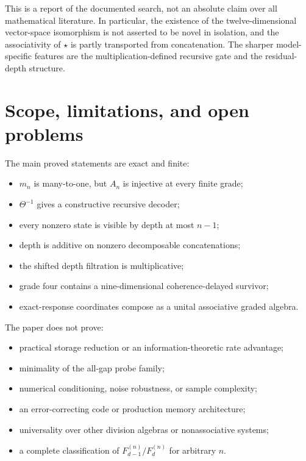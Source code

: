 \documentclass[11pt]{article}
\theoremstyle{definition}
\theoremstyle{remark}
\newcommand{\bridge}{\star}
\begin{document}
This is a report of the documented search, not an absolute claim over all mathematical literature.  In particular, the existence of the twelve-dimensional vector-space isomorphism is not asserted to be novel in isolation, and the associativity of $\bridge$ is partly transported from concatenation.  The sharper model-specific features are the multiplication-defined recursive gate and the residual-depth structure.

\section{Scope, limitations, and open problems}\label{sec:limitations}

The main proved statements are exact and finite:
\begin{itemize}
  \item $m_n$ is many-to-one, but $A_n$ is injective at every finite grade;
  \item $\Theta^{-1}$ gives a constructive recursive decoder;
  \item every nonzero state is visible by depth at most $n-1$;
  \item depth is additive on nonzero decomposable concatenations;
  \item the shifted depth filtration is multiplicative;
  \item grade four contains a nine-dimensional coherence-delayed survivor;
  \item exact-response coordinates compose as a unital associative graded algebra.
\end{itemize}

The paper does not prove:
\begin{itemize}
  \item practical storage reduction or an information-theoretic rate advantage;
  \item minimality of the all-gap probe family;
  \item numerical conditioning, noise robustness, or sample complexity;
  \item an error-correcting code or production memory architecture;
  \item universality over other division algebras or nonassociative systems;
  \item a complete classification of $F_{d-1}^{(n)}/F_d^{(n)}$ for arbitrary $n$.
\end{itemize}
\end{document}

